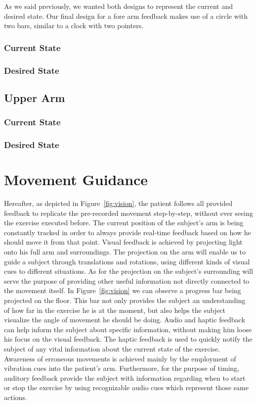 As we said previously, we wanted both designs to represent the current and desired state. Our final design for a fore arm feedback makes use of a circle with two bars, similar to a clock with two pointers.

\subsubsection{Current State}


\subsubsection{Desired State}

\subsection{Upper Arm}
\subsubsection{Current State}
\subsubsection{Desired State}

\section{Movement Guidance}

Hereafter, as depicted in Figure~\ref{fig:vision}, 
the patient follows all provided feedback to replicate the pre-recorded movement step-by-step, without ever seeing the exercise executed before.
The current position of the subject's arm is being constantly tracked in order to always provide real-time 
feedback based on how he should move it from that point.
Visual feedback is achieved by projecting light onto his full arm and surroundings. The projection on the arm will enable us to 
guide a subject through translations and rotations, using different kinds of visual cues to different situations. As for the projection on the subject's surrounding 
will serve the purpose of providing other useful information not directly connected to the movement itself. 
In Figure~\ref{fig:vision} we can observe a progress bar being projected on the floor. 
This bar not only provides the subject an understanding of how far in the exercise he is at the moment, but also helps the subject visualize the angle of movement he should be doing.
Audio and haptic feedback can help inform the subject about specific information, without making him loose his focus on the visual feedback.
The haptic feedback is used to quickly notify the subject of any vital information about the current state of the exercise. 
Awareness of erroneous movements is achieved mainly by the employment of vibration cues into the patient's arm.
Furthermore, for the purpose of timing, auditory feedback provide the subject with information regarding when to start or stop the exercise by using recognizable audio cues which represent those same actions.

